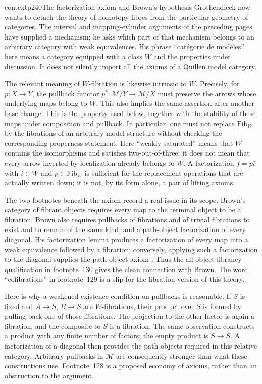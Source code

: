 
\begin{dcomment}{context}{p240}{The factorization axiom and Brown's hypothesis}
Grothendieck now wants to detach the theory of homotopy fibres from the particular geometry of categories. The interval and mapping-cylinder arguments of the preceding pages have supplied a mechanism; he asks which part of that mechanism belongs to an arbitrary category with weak equivalences. His phrase ``catégorie de modèles'' here means a category equipped with a class $W$ and the properties under discussion. It does not silently import all the axioms of a Quillen model category.

The relevant meaning of $W$-fibration is likewise intrinsic to $W$. Precisely, for $p:X\to Y$, the pullback functor $p^*:\mathcal M/Y\to\mathcal M/X$ must preserve the arrows whose underlying maps belong to $W$. This also implies the same assertion after another base change. This is the property used below, together with the stability of these maps under composition and pullback. In particular, one must not replace $\mathrm{Fib}_W$ by the fibrations of an arbitrary model structure without checking the corresponding properness statement. Here ``weakly saturated'' means that $W$ contains the isomorphisms and satisfies two-out-of-three; it does not mean that every arrow inverted by localization already belongs to $W$. A factorization $f=pi$ with $i\in W$ and $p\in\mathrm{Fib}_W$ is sufficient for the replacement operations that are actually written down; it is not, by its form alone, a pair of lifting axioms.

The two footnotes beneath the axiom record a real issue in its scope. Brown's category of fibrant objects requires every map to the terminal object to be a fibration. Brown also requires pullbacks of fibrations and of trivial fibrations to exist and to remain of the same kind, and a path-object factorization of every diagonal. His factorization lemma produces a factorization of every map into a weak equivalence followed by a fibration; conversely, applying such a factorization to the diagonal supplies the path-object axiom \citep[Part~I, \S1, pp.~420--422]{Brown1973}. Thus the all-object-fibrancy qualification in footnote~130 gives the clean connection with Brown. The word ``cofibrations'' in footnote~129 is a slip for the fibration version of this theory.

Here is why a weakened existence condition on pullbacks is reasonable. If $S$ is fixed and $A\to S$, $B\to S$ are $W$-fibrations, their product over $S$ is formed by pulling back one of those fibrations. The projection to the other factor is again a fibration, and the composite to $S$ is a fibration. The same observation constructs a product with any finite number of factors; the empty product is $S\to S$. A factorization of a diagonal then provides the path objects required in this relative category. Arbitrary pullbacks in $\mathcal M$ are consequently stronger than what these constructions use. Footnote~128 is a proposed economy of axioms, rather than an obstruction to the argument.


\end{dcomment}
